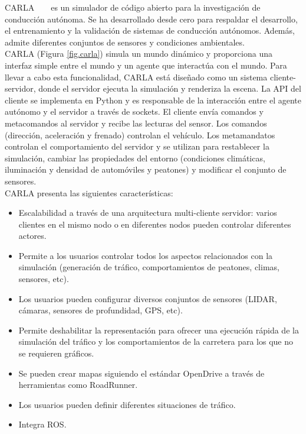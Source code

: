 CARLA ~\cite{carla} ~\cite{carla-org} es un simulador de código abierto para la investigación de conducción autónoma. Se ha desarrollado desde cero para respaldar el desarrollo, el entrenamiento y la validación de sistemas de conducción autónomos. Además, admite diferentes conjuntos de sensores y condiciones ambientales.\\

CARLA (Figura \ref{fig.carla}) simula un mundo dinámico y proporciona una interfaz simple entre el mundo y un agente que interactúa con el mundo. Para llevar a cabo esta funcionalidad, CARLA está diseñado como un sistema cliente-servidor, donde el servidor ejecuta la simulación y renderiza la escena. La API del cliente se implementa en Python y es responsable de la interacción entre el agente autónomo y el servidor a través de sockets. El cliente envía comandos y metacomandos al servidor y recibe las lecturas del sensor. Los comandos (dirección, aceleración y frenado) controlan el vehículo. Los metamandatos controlan el comportamiento del servidor y se utilizan para restablecer la simulación, cambiar las propiedades del entorno (condiciones climáticas, iluminación y densidad de automóviles y peatones) y modificar el conjunto de sensores. \\

CARLA presenta las siguientes características:

\begin{itemize}
\item Escalabilidad a través de una arquitectura multi-cliente servidor: varios clientes en el mismo nodo o en diferentes nodos pueden controlar diferentes actores.
\item Permite a los usuarios controlar todos los aspectos relacionados con la simulación (generación de tráfico, comportamientos de peatones, climas, sensores, etc).
\item  Los usuarios pueden configurar diversos conjuntos de sensores (LIDAR, cámaras, sensores de profundidad, GPS, etc).
\item Permite deshabilitar la representación para ofrecer una ejecución rápida de la simulación del tráfico y los comportamientos de la carretera para los que no se requieren gráficos.
\item Se pueden crear mapas siguiendo el estándar OpenDrive a través de herramientas como RoadRunner.
\item Los usuarios pueden definir diferentes situaciones de tráfico.
\item Integra ROS.
\end{itemize}

